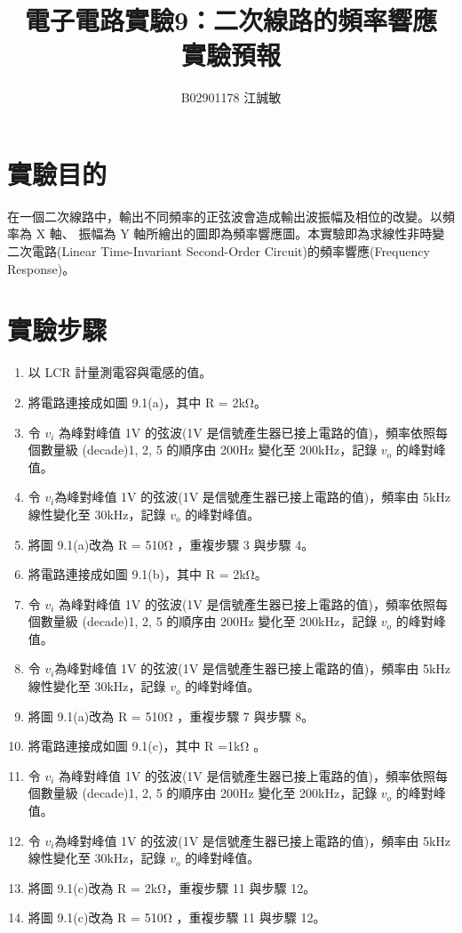 \documentclass[12pt, a4paper]{article}
\title{ \bf {\huge 電子電路實驗9：二次線路的頻率響應}\\ 實驗預報}
\author{B02901178 江誠敏}
\begin{document}
\maketitle

\section{實驗目的}
在一個二次線路中，輸出不同頻率的正弦波會造成輸出波振幅及相位的改變。以頻率為 X 軸、 振幅為 Y 軸所繪出的圖即為頻率響應圖。本實驗即為求線性非時變二次電路(Linear Time-Invariant Second-Order Circuit)的頻率響應(Frequency Response)。


\section{實驗步驟}
\begin{enumerate}[itemsep=0pt]
  \item 以 LCR 計量測電容與電感的值。
  \item 將電路連接成如圖 9.1(a)，其中 R = 2kΩ。
  \item 令 $v_i$ 為峰對峰值 1V 的弦波(1V 是信號產生器已接上電路的值)，頻率依照每個數量級
  (decade)1, 2, 5 的順序由 200Hz 變化至 200kHz，記錄 $v_o$ 的峰對峰值。
  \item 令 $v_i$為峰對峰值 1V 的弦波(1V 是信號產生器已接上電路的值)，頻率由 5kHz 線性變化至
  30kHz，記錄 $v_o$ 的峰對峰值。
  \item 將圖 9.1(a)改為 R = 510Ω ，重複步驟 3 與步驟 4。
  \item 將電路連接成如圖 9.1(b)，其中 R = 2kΩ。
  \item 令 $v_i$ 為峰對峰值 1V 的弦波(1V 是信號產生器已接上電路的值)，頻率依照每個數量級
  (decade)1, 2, 5 的順序由 200Hz 變化至 200kHz，記錄 $v_o$ 的峰對峰值。
  \item 令 $v_i$為峰對峰值 1V 的弦波(1V 是信號產生器已接上電路的值)，頻率由 5kHz 線性變化至
  30kHz，記錄 $v_o$ 的峰對峰值。
  \item 將圖 9.1(a)改為 R = 510Ω ，重複步驟 7 與步驟 8。
  \item 將電路連接成如圖 9.1(c)，其中 R =1kΩ 。
  \item 令 $v_i$ 為峰對峰值 1V 的弦波(1V 是信號產生器已接上電路的值)，頻率依照每個數量級
  (decade)1, 2, 5 的順序由 200Hz 變化至 200kHz，記錄 $v_o$ 的峰對峰值。
  \item 令 $v_i$為峰對峰值 1V 的弦波(1V 是信號產生器已接上電路的值)，頻率由 5kHz 線性變化至
  30kHz，記錄 $v_o$ 的峰對峰值。
  \item 將圖 9.1(c)改為 R = 2kΩ，重複步驟 11 與步驟 12。
  \item 將圖 9.1(c)改為 R = 510Ω ，重複步驟 11 與步驟 12。
\end{enumerate}
\end{document}

